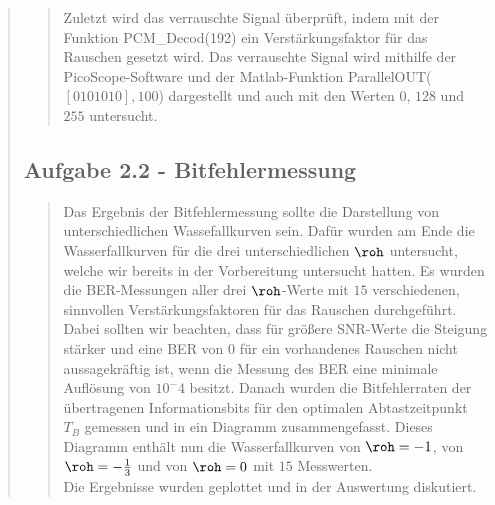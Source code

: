 \begin{quote}
\begin{quote}
        Zuletzt wird das verrauschte Signal überprüft, indem mit der Funktion
        PCM\_Decod(192) ein Verstärkungsfaktor für das Rauschen gesetzt wird.
        Das verrauschte Signal wird mithilfe der PicoScope-Software und der
        Matlab-Funktion ParallelOUT($[0 1 0 1 0 1 0],100$) dargestellt und auch
        mit den Werten $0$, $128$ und $255$ untersucht.
        
        
    \end{quote}%
    
    \subsection{Aufgabe 2.2 - Bitfehlermessung}
    \begin{quote}
    
        Das Ergebnis der Bitfehlermessung sollte die Darstellung von
        unterschiedlichen Wassefallkurven sein. Dafür wurden am Ende die
        Wasserfallkurven für die drei unterschiedlichen $\roh$ untersucht,
        welche wir bereits in der Vorbereitung untersucht hatten. Es wurden die
        BER-Messungen aller drei $\roh$-Werte mit $15$ verschiedenen, sinnvollen
        Verstärkungsfaktoren für das Rauschen durchgeführt. Dabei sollten wir
        beachten, dass für größere SNR-Werte die Steigung stärker und eine BER
        von $0$ für ein vorhandenes Rauschen nicht aussagekräftig ist, wenn die
        Messung des BER eine minimale Auflösung von $10^-4$ besitzt. Danach
        wurden die Bitfehlerraten der übertragenen Informationsbits für
        den optimalen Abtastzeitpunkt $T_B$ gemessen und in ein Diagramm
        zusammengefasst. Dieses Diagramm enthält nun die Wasserfallkurven von
        $\roh = -1$, von $\roh = -\frac{1}{3}$ und von $\roh = 0$ mit $15$
        Messwerten.\\
        Die Ergebnisse wurden geplottet und in der Auswertung diskutiert.  
          
    \end{quote}%

\end{quote}%


    
